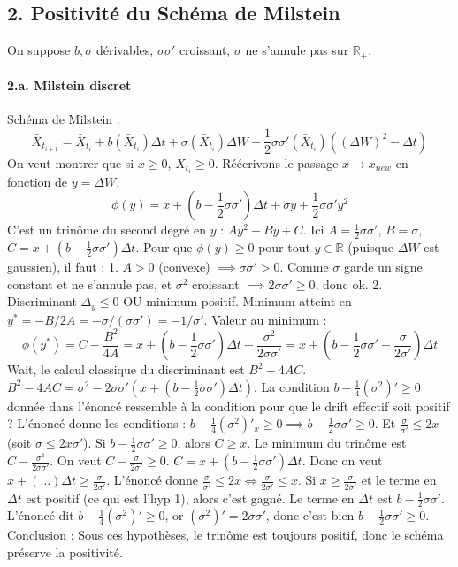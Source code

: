 \documentclass[a4paper,11pt]{article}
\begin{document}
\subsection{2. Positivité du Schéma de Milstein}

On suppose $b, \sigma$ dérivables, $\sigma \sigma'$ croissant, $\sigma$ ne s'annule pas sur $\mathbb{R}_+$.

\paragraph{2.a. Milstein discret}
Schéma de Milstein :
\[ \bar{X}_{t_{i+1}} = \bar{X}_{t_i} + b(\bar{X}_{t_i}) \Delta t + \sigma(\bar{X}_{t_i}) \Delta W + \frac{1}{2} \sigma\sigma'(\bar{X}_{t_i}) ((\Delta W)^2 - \Delta t) \]
On veut montrer que si $x \ge 0$, $\bar{X}_{t_i} \ge 0$.
Réécrivons le passage $x \to x_{new}$ en fonction de $y = \Delta W$.
\[ \phi(y) = x + (b - \frac{1}{2}\sigma\sigma')\Delta t + \sigma y + \frac{1}{2}\sigma\sigma' y^2 \]
C'est un trinôme du second degré en $y$ : $Ay^2 + By + C$.
Ici $A = \frac{1}{2}\sigma\sigma'$, $B = \sigma$, $C = x + (b - \frac{1}{2}\sigma\sigma')\Delta t$.
Pour que $\phi(y) \ge 0$ pour tout $y \in \mathbb{R}$ (puisque $\Delta W$ est gaussien), il faut :
1. $A > 0$ (convexe) $\implies \sigma \sigma' > 0$. Comme $\sigma$ garde un signe constant et ne s'annule pas, et $\sigma^2$ croissant $\implies 2\sigma\sigma' \ge 0$, donc ok.
2. Discriminant $\Delta_y \le 0$ OU minimum positif.
Minimum atteint en $y^* = -B/2A = -\sigma / (\sigma\sigma') = -1/\sigma'$.
Valeur au minimum :
\[ \phi(y^*) = C - \frac{B^2}{4A} = x + (b - \frac{1}{2}\sigma\sigma')\Delta t - \frac{\sigma^2}{2\sigma\sigma'} = x + (b - \frac{1}{2}\sigma\sigma' - \frac{\sigma}{2\sigma'})\Delta t \]
Wait, le calcul classique du discriminant est $B^2 - 4AC$.
$B^2 - 4AC = \sigma^2 - 2\sigma\sigma'(x + (b - \frac{1}{2}\sigma\sigma')\Delta t)$.
La condition $b - \frac{1}{4}(\sigma^2)' \ge 0$ donnée dans l'énoncé ressemble à la condition pour que le drift effectif soit positif ?
L'énoncé donne les conditions :
$b - \frac{1}{4}(\sigma^2)'_x \ge 0 \implies b - \frac{1}{2}\sigma\sigma' \ge 0$.
Et $\frac{\sigma}{\sigma'} \le 2x$ (soit $\sigma \le 2x \sigma'$).
Si $b - \frac{1}{2}\sigma\sigma' \ge 0$, alors $C \ge x$.
Le minimum du trinôme est $C - \frac{\sigma^2}{2\sigma\sigma'}$.
On veut $C - \frac{\sigma}{2\sigma'} \ge 0$.
$C = x + (b - \frac{1}{2}\sigma\sigma')\Delta t$.
Donc on veut $x + (\dots)\Delta t \ge \frac{\sigma}{2\sigma'}$.
L'énoncé donne $\frac{\sigma}{\sigma'} \le 2x \iff \frac{\sigma}{2\sigma'} \le x$.
Si $x \ge \frac{\sigma}{2\sigma'}$ et le terme en $\Delta t$ est positif (ce qui est l'hyp 1), alors c'est gagné.
Le terme en $\Delta t$ est $b - \frac{1}{2}\sigma\sigma'$.
L'énoncé dit $b - \frac{1}{4}(\sigma^2)' \ge 0$, or $(\sigma^2)' = 2\sigma\sigma'$, donc c'est bien $b - \frac{1}{2}\sigma\sigma' \ge 0$.
Conclusion : Sous ces hypothèses, le trinôme est toujours positif, donc le schéma préserve la positivité.
\end{document}
